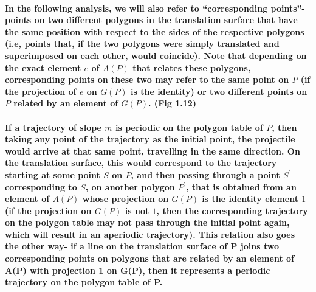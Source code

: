 \documentclass{report}
\begin{document}
\pagebreak

\paragraph{In the following analysis, we will also refer to “corresponding points”- points on two different polygons in the translation surface that have the same position with respect to the sides of the respective polygons (i.e, points that, if the two polygons were simply translated and superimposed on each other, would coincide). Note that depending on the exact element $e$ of $A(P)$ that relates these polygons, corresponding points on these two may refer to the same point on $P$ (if the projection of $e$ on $G(P)$ is the identity) or two different points on $P$ related by an element of $G(P)$. (Fig 1.12)}


\paragraph{If a trajectory of slope $m$ is periodic on the polygon table of $P$, then taking any point of the trajectory as the initial point, the projectile would arrive at that same point, travelling in the same direction. On the translation surface, this would correspond to the trajectory starting at some point $S$ on $P$, and then passing through a point $S^\prime$ corresponding to $S$, on another polygon $P^\prime$, that is obtained from an element of $A(P)$ whose projection on $G(P)$ is the identity element $1$ (if the projection on $G(P)$ is not $1$, then the corresponding trajectory on the polygon table may not pass through the initial point again, which will result in an aperiodic trajectory). This relation also goes the other way- if a line on the translation surface of P joins two corresponding points on polygons that are related by an element of A(P) with projection 1 on G(P), then it represents a periodic trajectory on the polygon table of P.}
\end{document}
